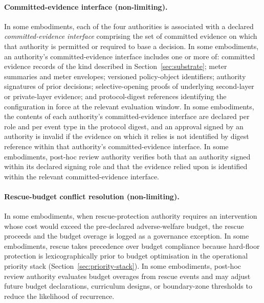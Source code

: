 \documentclass[a4paper,12pt]{article}
\begin{document}
\paragraph{Committed-evidence interface (non-limiting).}
In some embodiments, each of the four authorities is associated with
a declared \emph{committed-evidence interface} comprising the set of
committed evidence on which that authority is permitted or required
to base a decision. In some embodiments, an authority's
committed-evidence interface includes one or more of: committed
evidence records of the kind described in
Section~\ref{sec:substrate}; meter summaries and meter envelopes;
versioned policy-object identifiers; authority signatures of prior
decisions; selective-opening proofs of underlying second-layer or
private-layer evidence; and protocol-digest references identifying
the configuration in force at the relevant evaluation window. In
some embodiments, the contents of each authority's
committed-evidence interface are declared per role and per event
type in the protocol digest, and an approval signed by an authority
is invalid if the evidence on which it relies is not identified by
digest reference within that authority's committed-evidence
interface. In some embodiments, post-hoc review authority verifies
both that an authority signed within its declared signing role and
that the evidence relied upon is identified within the relevant
committed-evidence interface.

\paragraph{Rescue-budget conflict resolution (non-limiting).}
In some embodiments, when rescue-protection authority requires an
intervention whose cost would exceed the pre-declared adverse-welfare
budget, the rescue proceeds and the budget overage is logged as a
governance exception. In some embodiments, rescue takes precedence
over budget compliance because hard-floor protection is
lexicographically prior to budget optimisation in the operational
priority stack (Section~\ref{sec:priority-stack}). In some
embodiments, post-hoc review authority evaluates budget overages from
rescue events and may adjust future budget declarations, curriculum
designs, or boundary-zone thresholds to reduce the likelihood of
recurrence.

\end{document}
